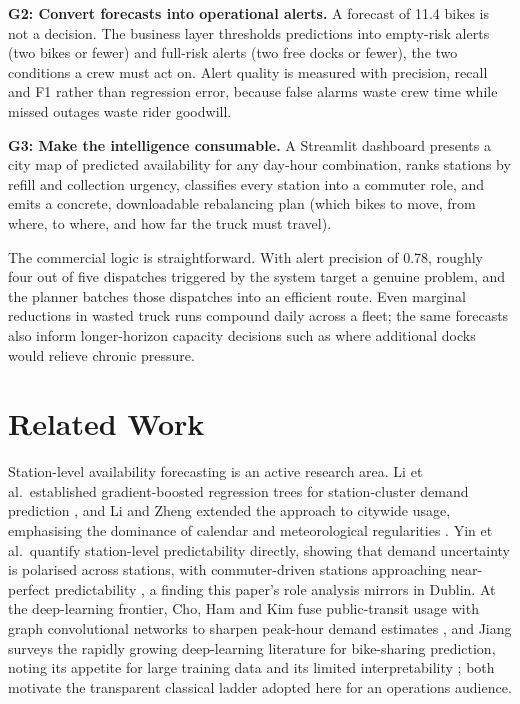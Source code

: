 \documentclass[conference]{IEEEtran}
\begin{document}
\textbf{G2: Convert forecasts into operational alerts.} A forecast of 11.4 bikes is not a decision. The business layer thresholds predictions into empty-risk alerts (two bikes or fewer) and full-risk alerts (two free docks or fewer), the two conditions a crew must act on. Alert quality is measured with precision, recall and F1 rather than regression error, because false alarms waste crew time while missed outages waste rider goodwill.

\textbf{G3: Make the intelligence consumable.} A Streamlit dashboard presents a city map of predicted availability for any day-hour combination, ranks stations by refill and collection urgency, classifies every station into a commuter role, and emits a concrete, downloadable rebalancing plan (which bikes to move, from where, to where, and how far the truck must travel).

The commercial logic is straightforward. With alert precision of 0.78, roughly four out of five dispatches triggered by the system target a genuine problem, and the planner batches those dispatches into an efficient route. Even marginal reductions in wasted truck runs compound daily across a fleet; the same forecasts also inform longer-horizon capacity decisions such as where additional docks would relieve chronic pressure.

\section{Related Work}
Station-level availability forecasting is an active research area. Li et al.\ established gradient-boosted regression trees for station-cluster demand prediction \cite{li2015traffic}, and Li and Zheng extended the approach to citywide usage, emphasising the dominance of calendar and meteorological regularities \cite{li2020citywide}. Yin et al.\ quantify station-level predictability directly, showing that demand uncertainty is polarised across stations, with commuter-driven stations approaching near-perfect predictability \cite{yin2023understanding}, a finding this paper's role analysis mirrors in Dublin. At the deep-learning frontier, Cho, Ham and Kim fuse public-transit usage with graph convolutional networks to sharpen peak-hour demand estimates \cite{cho2021enhancing}, and Jiang surveys the rapidly growing deep-learning literature for bike-sharing prediction, noting its appetite for large training data and its limited interpretability \cite{jiang2022bike}; both motivate the transparent classical ladder adopted here for an operations audience.
\end{document}
